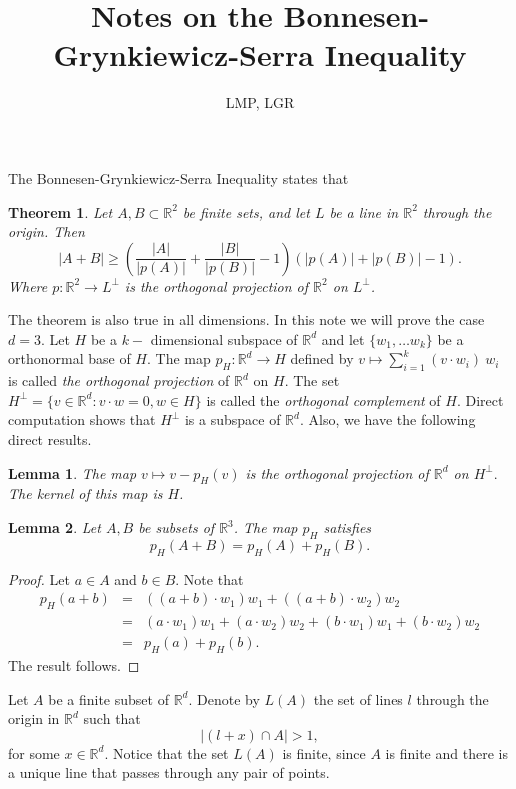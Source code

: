 \documentclass[12pt]{article}
\title{Notes on the Bonnesen-Grynkiewicz-Serra Inequality}
\author{LMP, LGR}
\newcommand{\R}{\mathbb{R}}
\newtheorem{theorem}{Theorem}
\newtheorem{lemma}{Lemma}
\begin{document}
\maketitle

The Bonnesen-Grynkiewicz-Serra Inequality states that %
\begin{theorem} \label{GS}
Let $A, B \subset \R^2$ be finite sets, and let $L$ be a line in $\R^2$ through the origin. Then
$$\lvert A + B \rvert \geq \left( \frac{\lvert A \rvert }{\lvert p (A) \rvert} + \frac{\lvert B \rvert }{\lvert p (B) \rvert } - 1\right) \left( \lvert p(A) \rvert + \lvert p(B) \rvert - 1 \right).$$
Where $p: \R^2 \rightarrow L^\perp$ is the orthogonal projection of $\R^2$ on $L^\perp$.
\end{theorem}

The theorem is also true in all dimensions. In this note we will prove the case $d = 3.$ Let $H$ be a $k-$ dimensional subspace of $\R^d$ and let $\{w_1, \ldots w_k\}$ be a orthonormal base of $H.$ The map $p_H: \R^d \rightarrow H$ defined by $v \mapsto \sum_{i=1}^k (v \cdot w_i) \ w_i$ is called \textit{the orthogonal projection} of $\R^d$ on $H.$ The set $H^\perp = \{v \in \R^d: v \cdot w = 0, w \in H \}$ is called the \textit{orthogonal complement} of $H$. Direct computation shows that $H^\perp$ is a subspace of $\R^d$. Also, we have the following direct results. %

\begin{lemma}
    The map $v \mapsto v - p_H (v)$ is the orthogonal projection of $\R^d$ on $H^\perp.$ The kernel of this map is $H$.
\end{lemma}

\begin{lemma}
    Let $A, B$ be subsets of $\R^3$. The map $p_H$ satisfies 
    $$p_H(A + B) = p_H(A) + p_H(B).$$
\end{lemma}
\begin{proof} Let $a \in A$ and $b\in B.$ Note that 
\begin{eqnarray*}
p_H(a + b) &=&  ((a + b)\cdot w_1) w_1 + ((a+b) \cdot w_2) w_2\\
&=& (a\cdot w_1) w_1 + (a \cdot w_2) w_2 +(b\cdot w_1) w_1 + (b \cdot w_2) w_2\\
&=& p_H(a) + p_H(b).
\end{eqnarray*}
The result follows.
\end{proof}

Let $A$ be a finite subset of $\R^d$. Denote by $L(A)$ the set of lines $l$ through the origin in $\R^d$ such that
$$\lvert (l + x) \cap A \rvert > 1,$$
for some $x \in \R^d$. Notice that the set $L(A)$ is finite, since $A$ is finite and there is a unique line that passes through any pair of points.


\end{document}

